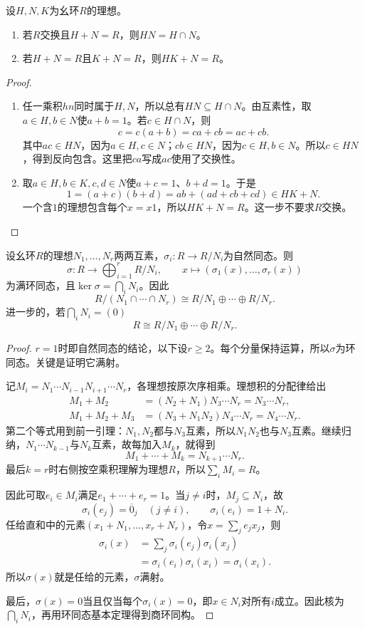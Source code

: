 \begin{lemma}\label{p2:ring-comaximal-product}
设$H,N,K$为幺环$R$的理想。
\begin{enumerate}
\item 若$R$交换且$H+N=R$，则$HN=H\cap N$。
\item 若$H+N=R$且$K+N=R$，则$HK+N=R$。
\end{enumerate}
\end{lemma}
\begin{proof}
	\begin{enumerate}
		\item 任一乘积$hn$同时属于$H,N$，所以总有$HN\subseteq H\cap N$。由互素性，取$a\in H,b\in N$使$a+b=1$。若$c\in H\cap N$，则
		\[
		c=c(a+b)=ca+cb=ac+cb.
		\]
		其中$ac\in HN$，因为$a\in H,c\in N$；$cb\in HN$，因为$c\in H,b\in N$。所以$c\in HN$，得到反向包含。这里把$ca$写成$ac$使用了交换性。
		
		\item 取$a\in H,b\in K,c,d\in N$使$a+c=1$、$b+d=1$。于是
		\[
		1=(a+c)(b+d)=ab+(ad+cb+cd)\in HK+N.
		\]
		一个含$1$的理想包含每个$x=x1$，所以$HK+N=R$。这一步不要求$R$交换。
	\end{enumerate}
\end{proof}

\begin{theorem}\label{p2:ring-crt}
设幺环$R$的理想$N_1,\ldots,N_r$两两互素，$\sigma_i:R\to R/N_i$为自然同态。则
\[
\sigma:R\longrightarrow\bigoplus_{i=1}^rR/N_i,
\qquad x\longmapsto(\sigma_1(x),\ldots,\sigma_r(x))
\]
为满环同态，且$\ker\sigma=\bigcap_iN_i$。因此
\[
R/(N_1\cap\cdots\cap N_r)\cong R/N_1\oplus\cdots\oplus R/N_r.
\]
进一步的，若$\bigcap\limits_iN_i=(0)$
\[R\cong R/N_1\oplus\cdots\oplus R/N_r.\]
\end{theorem}
\begin{proof}
$r=1$时即自然同态的结论，以下设$r\geq2$。每个分量保持运算，所以$\sigma$为环同态。关键是证明它满射。

记$M_i=N_1\cdots N_{i-1}N_{i+1}\cdots N_r$，各理想按原次序相乘。理想积的分配律给出
\begin{align*}
M_1+M_2&=(N_2+N_1)N_3\cdots N_r=N_3\cdots N_r,\\
M_1+M_2+M_3&=(N_3+N_1N_2)N_4\cdots N_r=N_4\cdots N_r.
\end{align*}
第二个等式用到前一引理：$N_1,N_2$都与$N_3$互素，所以$N_1N_2$也与$N_3$互素。继续归纳，$N_1\cdots N_{k-1}$与$N_k$互素，故每加入$M_k$，就得到
\[
M_1+\cdots+M_k=N_{k+1}\cdots N_r.
\]
最后$k=r$时右侧按空乘积理解为理想$R$，所以$\sum_iM_i=R$。

因此可取$e_i\in M_i$满足$e_1+\cdots+e_r=1$。当$j\ne i$时，$M_j\subseteq N_i$，故
\[
\sigma_i(e_j)=\overline{0}_j
\quad(j\ne i),\qquad\sigma_i(e_i)=1+N_i.
\]
任给直和中的元素$(x_1+N_1,\ldots,x_r+N_r)$，令$x=\sum_j e_jx_j$，则
\begin{align*}
\sigma_i(x)&=\sum_j\sigma_i(e_j)\sigma_i(x_j)\\
&=\sigma_i(e_i)\sigma_i(x_i)=\sigma_i(x_i).
\end{align*}
所以$\sigma(x)$就是任给的元素，$\sigma$满射。

最后，$\sigma(x)=0$当且仅当每个$\sigma_i(x)=0$，即$x\in N_i$对所有$i$成立。因此核为$\bigcap_iN_i$，再用环同态基本定理得到商环同构。
\end{proof}

